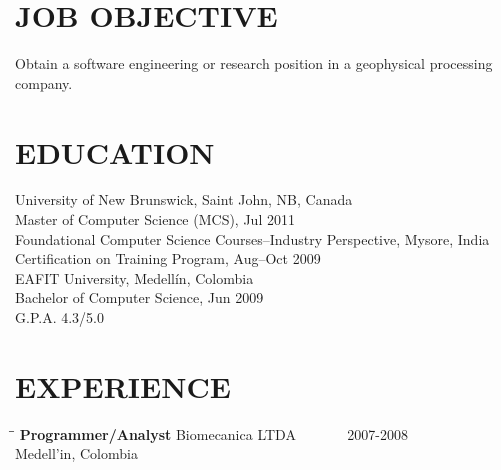 \documentclass{res}
\begin{document}
 


                                  
\begin{resume}

\section{JOB OBJECTIVE}          
   \vspace{0.05 in}
 Obtain a software engineering or research position in a geophysical processing company.
\section{EDUCATION}
   \vspace{0.05 in}
	University of New Brunswick, Saint John, NB, Canada\\
	Master of Computer Science (MCS), Jul 2011\\\vspace{10pt}
	Foundational Computer Science Courses--Industry Perspective, Mysore, India\\
	Certification on Training Program, Aug--Oct 2009\\\vspace{10pt}       
    EAFIT University, Medell\'{i}n, Colombia\\        
    Bachelor of Computer Science, Jun 2009\\       
    G.P.A. 4.3/5.0          
 
\section{EXPERIENCE}
   \vspace{0.05 in}	
   \begin{tabbing}
   \hspace{2.3in}\= \hspace{2.6in}\= \kill %
    {\bf Programmer/Analyst} \>Biomecanica LTDA\> ~~~~~~ 2007-2008\\
                             \>Medell\a'in, Colombia
   \end{tabbing}\vspace{-15pt}      %


\end{resume}
\end{document}
